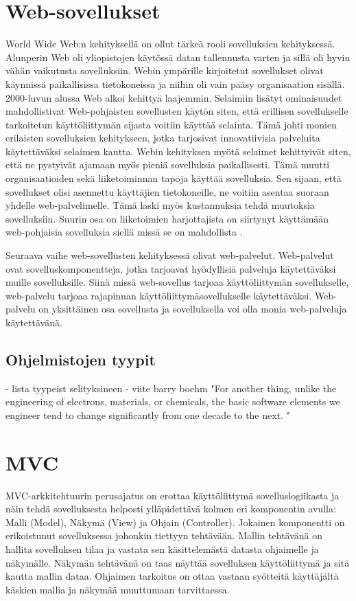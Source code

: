 \documentclass[utf8]{gradu3}
\begin{document}
\chapter{Web-sovellukset}
World Wide Web:n kehityksellä on ollut tärkeä rooli sovelluksien kehityksessä. Alunperin Web oli yliopistojen käytössä datan tallennusta varten ja sillä oli hyvin vähän vaikutusta sovelluksiin. Webin ympärille kirjoitetut sovellukset olivat käynnissä paikallisissa tietokoneissa ja niihin oli vain pääsy organisaation sisällä. 2000-luvun alussa Web alkoi kehittyä laajemmin. Selaimiin lisätyt ominaisuudet mahdollistivat Web-pohjaisten sovellusten käytön siten, että erillisen sovellukselle tarkoitetun käyttöliittymän sijasta voitiin käyttää selainta. Tämä johti monien erilaisten sovelluksien kehitykseen, jotka tarjosivat innovatiivisia palveluita käytettäväksi selaimen kautta. Webin kehityksen myötä selaimet kehittyivät siten, että ne pystyivät ajamaan myös pieniä sovelluksia paikallisesti. Tämä muutti organisaatioiden sekä liiketoiminnan tapoja käyttää sovelluksia. Sen sijaan, että sovellukset olisi asennettu käyttäjien tietokoneille, ne voitiin asentaa suoraan yhdelle web-palvelimelle. Tämä laski myös kustannuksia tehdä muutoksia sovelluksiin. Suurin osa on liiketoimien harjottajista on siirtynyt käyttämään web-pohjaisia sovelluksia siellä missä se on mahdollista \cite{Sommerville}.

Seuraava vaihe web-sovellusten kehityksessä olivat web-palvelut. Web-palvelut ovat sovelluskomponentteja, jotka tarjoavat hyödyllisiä palveluja käytettäväksi muille sovelluksille. Siinä missä web-sovellus tarjoaa käyttöliittymän sovellukselle, web-palvelu tarjoaa rajapinnan käyttöliittymäsovellukselle käytettäväksi. Web-palvelu on yksittäinen osa sovellusta ja sovelluksella voi olla monia web-palveluja käytettävänä. 


\section{Ohjelmistojen tyypit}
- lista tyypeist selityksineen
- viite barry boehm "For another thing, unlike the engineering of electrons, materials, or chemicals, the basic software elements we engineer tend to change significantly from one decade to the next. "

\chapter{MVC}
MVC-arkkitehtuurin perusajatus on erottaa käyttöliittymä sovelluslogiikasta ja
näin tehdä sovelluksesta helposti ylläpidettävä kolmen eri komponentin avulla:
Malli (Model), Näkymä (View) ja Ohjain (Controller). Jokainen komponentti on
erikoistunut sovelluksessa johonkin tiettyyn tehtävään. Mallin tehtävänä on
hallita sovelluksen tilaa ja vastata sen käsittelemästä datasta ohjaimelle ja näkymälle.
Näkymän tehtävänä on taas näyttää sovelluksen käyttöliittymä ja sitä kautta mallin dataa. 
Ohjaimen tarkoitus on ottaa vastaan syötteitä käyttäjältä käskien mallia ja näkymää muuttumaan tarvittaessa.
\end{document}
